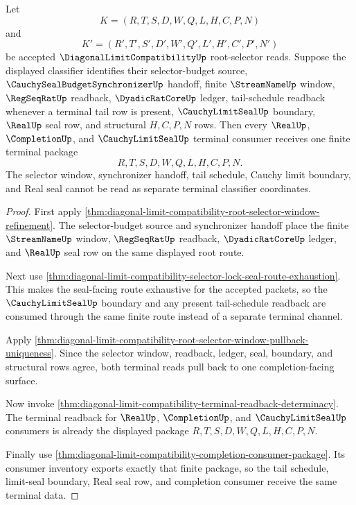 \begin{theorem}
\label{thm:diagonal-limit-compatibility-selector-window-tail-seal-bridge}
Let
$$
K=(R,T,S,D,W,Q,L,H,C,P,N)
$$
and
$$
K'=(R',T',S',D',W',Q',L',H',C',P',N')
$$
be accepted $\DiagonalLimitCompatibilityUp$ root-selector reads. Suppose the displayed classifier identifies their selector-budget source, $\CauchySealBudgetSynchronizerUp$ handoff, finite $\StreamNameUp$ window, $\RegSeqRatUp$ readback, $\DyadicRatCoreUp$ ledger, tail-schedule readback whenever a terminal tail row is present, $\CauchyLimitSealUp$ boundary, $\RealUp$ seal row, and structural $H,C,P,N$ rows. Then every $\RealUp$, $\CompletionUp$, and $\CauchyLimitSealUp$ terminal consumer receives one finite terminal package
$$
R,T,S,D,W,Q,L,H,C,P,N .
$$
The selector window, synchronizer handoff, tail schedule, Cauchy limit boundary, and Real seal cannot be read as separate terminal classifier coordinates.
\end{theorem}
\begin{proof}
First apply \autoref{thm:diagonal-limit-compatibility-root-selector-window-refinement}. The selector-budget source and synchronizer handoff place the finite $\StreamNameUp$ window, $\RegSeqRatUp$ readback, $\DyadicRatCoreUp$ ledger, and $\RealUp$ seal row on the same displayed root route.

Next use \autoref{thm:diagonal-limit-compatibility-selector-lock-seal-route-exhaustion}. This makes the seal-facing route exhaustive for the accepted packets, so the $\CauchyLimitSealUp$ boundary and any present tail-schedule readback are consumed through the same finite route instead of a separate terminal channel.

Apply \autoref{thm:diagonal-limit-compatibility-root-selector-window-pullback-uniqueness}. Since the selector window, readback, ledger, seal, boundary, and structural rows agree, both terminal reads pull back to one completion-facing surface.

Now invoke \autoref{thm:diagonal-limit-compatibility-terminal-readback-determinacy}. The terminal readback for $\RealUp$, $\CompletionUp$, and $\CauchyLimitSealUp$ consumers is already the displayed package $R,T,S,D,W,Q,L,H,C,P,N$.

Finally use \autoref{thm:diagonal-limit-compatibility-completion-consumer-package}. Its consumer inventory exports exactly that finite package, so the tail schedule, limit-seal boundary, Real seal row, and completion consumer receive the same terminal data.
\end{proof}

